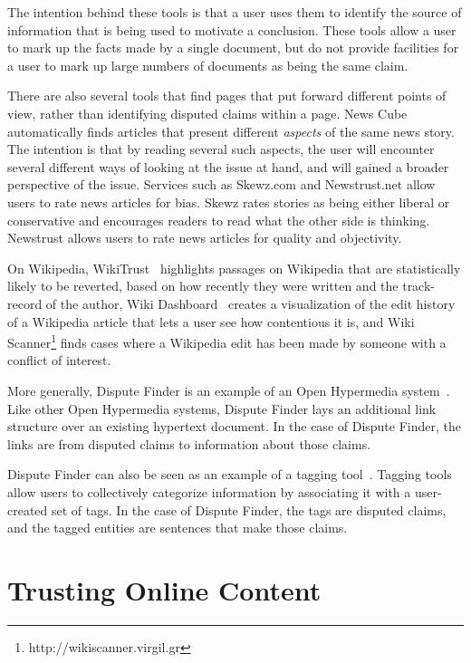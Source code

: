 \documentclass{www2010-submission}
\begin{document}
The intention behind these tools is that a user uses them to identify the source of information that is being used to motivate a conclusion. These tools allow a user to mark up the facts made by a single document, but do not provide facilities for a user to mark up large numbers of documents as being the same claim. 

There are also several tools that find pages that put forward different points of view, rather than identifying disputed claims within a page. News Cube~\cite{Park2009} automatically finds articles that present different {\it aspects} of the same news story. The intention is that by reading several such aspects, the user will encounter several different ways of looking at the issue at hand, and will gained a broader perspective of the issue. 
Services such as Skewz.com and Newstrust.net allow users to rate news articles for bias. Skewz rates stories as being either liberal or conservative and encourages readers to read what the other side is thinking. Newstrust allows users to rate news articles for quality and objectivity. 

On Wikipedia, WikiTrust~\cite{Adler2008a} highlights passages on Wikipedia that are statistically likely to be reverted, based on how recently they were written and the track-record of the author, Wiki Dashboard~\cite{Kittur2008} creates a visualization of the edit history of a Wikipedia article that lets a user see how contentious it is, and Wiki Scanner\footnote{http://wikiscanner.virgil.gr} finds cases where a Wikipedia edit has been made by someone with a conflict of interest. 

More generally, Dispute Finder is an example of an Open Hypermedia system~\cite{Bouvin2000,Wiil1996}. Like other Open Hypermedia systems, Dispute Finder lays an additional link structure over an existing hypertext document. In the case of Dispute Finder, the links are from disputed claims to information about those claims.

Dispute Finder can also be seen as an example of a tagging tool~\cite{Marlow2006,Golder2006}. Tagging tools allow users to collectively categorize information by associating it with a user-created set of tags. In the case of Dispute Finder, the tags are disputed claims, and the tagged entities are sentences that make those claims.


\section{Trusting Online Content}
\end{document}
